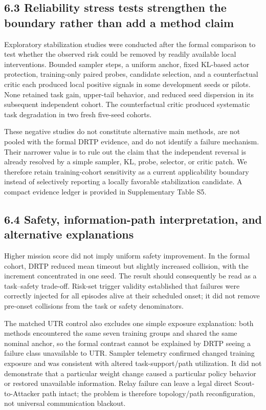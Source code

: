 \subsection{6.3 Reliability stress tests strengthen the boundary rather than add a method claim}

Exploratory stabilization studies were conducted after the formal comparison to test whether the observed risk could be removed by readily available local interventions. Bounded sampler steps, a uniform anchor, fixed KL-based actor protection, training-only paired probes, candidate selection, and a counterfactual critic each produced local positive signals in some development seeds or pilots. None retained task gain, upper-tail behavior, and reduced seed dispersion in its subsequent independent cohort. The counterfactual critic produced systematic task degradation in two fresh five-seed cohorts.

These negative studies do not constitute alternative main methods, are not pooled with the formal DRTP evidence, and do not identify a failure mechanism. Their narrower value is to rule out the claim that the independent reversal is already resolved by a simple sampler, KL, probe, selector, or critic patch. We therefore retain training-cohort sensitivity as a current applicability boundary instead of selectively reporting a locally favorable stabilization candidate. A compact evidence ledger is provided in Supplementary Table S5.

\subsection{6.4 Safety, information-path interpretation, and alternative explanations}

Higher mission score did not imply uniform safety improvement. In the formal cohort, DRTP reduced mean timeout but slightly increased collision, with the increment concentrated in one seed. The result should consequently be read as a task--safety trade-off. Risk-set trigger validity established that failures were correctly injected for all episodes alive at their scheduled onset; it did not remove pre-onset collisions from the task or safety denominators.

The matched UTR control also excludes one simple exposure explanation: both methods encountered the same seven training groups and shared the same nominal anchor, so the formal contrast cannot be explained by DRTP seeing a failure class unavailable to UTR. Sampler telemetry confirmed changed training exposure and was consistent with altered task-support/path utilization. It did not demonstrate that a particular weight change caused a particular policy behavior or restored unavailable information. Relay failure can leave a legal direct Scout-to-Attacker path intact; the problem is therefore topology/path reconfiguration, not universal communication blackout.

